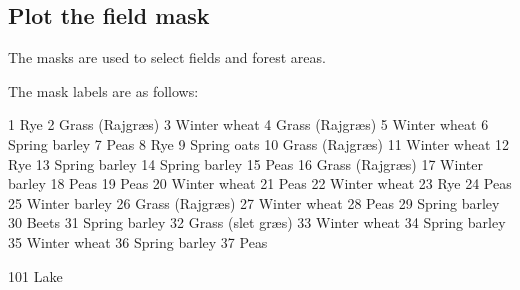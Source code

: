 \documentclass[11pt]{article}
\begin{document}
    \hypertarget{plot-the-field-mask}{%
\subsection{Plot the field mask}\label{plot-the-field-mask}}

The masks are used to select fields and forest areas.

The mask labels are as follows:

1 Rye 2 Grass (Rajgræs) 3 Winter wheat 4 Grass (Rajgræs) 5 Winter wheat
6 Spring barley 7 Peas 8 Rye 9 Spring oats 10 Grass (Rajgræs) 11 Winter
wheat 12 Rye 13 Spring barley 14 Spring barley 15 Peas 16 Grass
(Rajgræs) 17 Winter barley 18 Peas 19 Peas 20 Winter wheat 21 Peas 22
Winter wheat 23 Rye 24 Peas 25 Winter barley 26 Grass (Rajgræs) 27
Winter wheat 28 Peas 29 Spring barley 30 Beets 31 Spring barley 32 Grass
(slet græs) 33 Winter wheat 34 Spring barley 35 Winter wheat 36 Spring
barley 37 Peas

101 Lake
\end{document}
